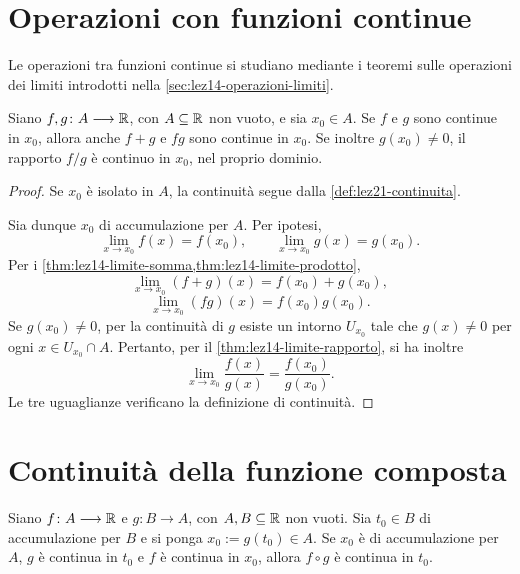 \section{Operazioni con funzioni continue}
\label{sec:lez21-operazioni-continuita}

Le operazioni tra funzioni continue si studiano
mediante i teoremi sulle operazioni dei limiti
introdotti nella \cref{sec:lez14-operazioni-limiti}.

\begin{proposition}
\label{prop:lez21-operazioni-continuita}
Siano \(f,g\colon A\longrightarrow\mathbb{R}\), con
\(A\subseteq\mathbb{R}\) non vuoto, e sia \(x_0\in A\).
Se \(f\) e \(g\) sono continue in \(x_0\), allora
anche \(f+g\) e \(fg\) sono continue in \(x_0\).
Se inoltre \(g(x_0)\ne0\), il rapporto \(f/g\)
è continuo in \(x_0\), nel proprio dominio.
\end{proposition}

\begin{proof}
Se \(x_0\) è isolato in \(A\), la continuità
segue dalla \cref{def:lez21-continuita}.

Sia dunque \(x_0\) di accumulazione per \(A\).
Per ipotesi,
\[
  \lim_{x\to x_0}f(x)=f(x_0),\qquad
  \lim_{x\to x_0}g(x)=g(x_0).
\]
Per i
\cref{thm:lez14-limite-somma,thm:lez14-limite-prodotto},
\[
  \lim_{x\to x_0}(f+g)(x)=f(x_0)+g(x_0),
\]
\[
  \lim_{x\to x_0}(fg)(x)=f(x_0)g(x_0).
\]
Se \(g(x_0)\ne0\), per la continuità di \(g\)
esiste un intorno \(U_{x_0}\) tale che
\(g(x)\ne0\) per ogni \(x\in U_{x_0}\cap A\).
Pertanto, per il \cref{thm:lez14-limite-rapporto},
si ha inoltre
\[
  \lim_{x\to x_0}\frac{f(x)}{g(x)}
  =\frac{f(x_0)}{g(x_0)}.
\]
Le tre uguaglianze verificano la definizione
di continuità.
\end{proof}

\section{Continuità della funzione composta}
\label{sec:lez21-continuita-composta}

\begin{proposition}
\label{prop:lez21-continuita-composta}
Siano \(f\colon A\longrightarrow\mathbb{R}\) e
\(g\colon B\longrightarrow A\), con \(A,B\subseteq\mathbb{R}\)
non vuoti. Sia \(t_0\in B\) di accumulazione
per \(B\) e si ponga \(x_0:=g(t_0)\in A\).
Se \(x_0\) è di accumulazione per \(A\),
\(g\) è continua in \(t_0\) e \(f\) è continua
in \(x_0\), allora \(f\circ g\) è continua
in \(t_0\).
\end{proposition}

